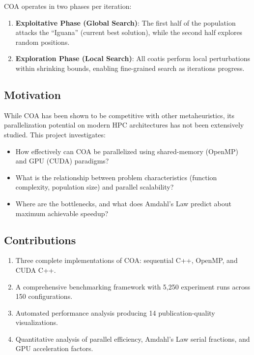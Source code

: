 \documentclass[12pt, a4paper]{article}
\begin{document}
COA operates in two phases per iteration:
\begin{enumerate}
    \item \textbf{Exploitative Phase (Global Search)}: The first half of the population attacks the ``Iguana'' (current best solution), while the second half explores random positions.
    \item \textbf{Exploration Phase (Local Search)}: All coatis perform local perturbations within shrinking bounds, enabling fine-grained search as iterations progress.
\end{enumerate}

\subsection{Motivation}

While COA has been shown to be competitive with other metaheuristics, its parallelization potential on modern HPC architectures has not been extensively studied. This project investigates:

\begin{itemize}
    \item How effectively can COA be parallelized using shared-memory (OpenMP) and GPU (CUDA) paradigms?
    \item What is the relationship between problem characteristics (function complexity, population size) and parallel scalability?
    \item Where are the bottlenecks, and what does Amdahl's Law predict about maximum achievable speedup?
\end{itemize}

\subsection{Contributions}

\begin{enumerate}
    \item Three complete implementations of COA: sequential C++, OpenMP, and CUDA C++.
    \item A comprehensive benchmarking framework with 5,250 experiment runs across 150 configurations.
    \item Automated performance analysis producing 14 publication-quality visualizations.
    \item Quantitative analysis of parallel efficiency, Amdahl's Law serial fractions, and GPU acceleration factors.
\end{enumerate}
\end{document}
